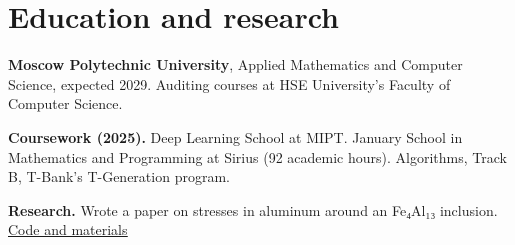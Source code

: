 \documentclass[10pt,a4paper]{article}
\begin{document}
\section{Education and research}
\textbf{Moscow Polytechnic University}, Applied Mathematics and Computer Science, expected 2029. Auditing courses at HSE University's Faculty of Computer Science.\par
\textbf{Coursework (2025).} Deep Learning School at MIPT. January School in Mathematics and Programming at Sirius (92 academic hours). Algorithms, Track B, T-Bank's T-Generation program.\par
\textbf{Research.} Wrote a paper on stresses in aluminum around an Fe₄Al₁₃ inclusion. \href{https://github.com/iluuua/magnetostriction-plasticity-bounds}{\underline{Code and materials}}
\end{document}
